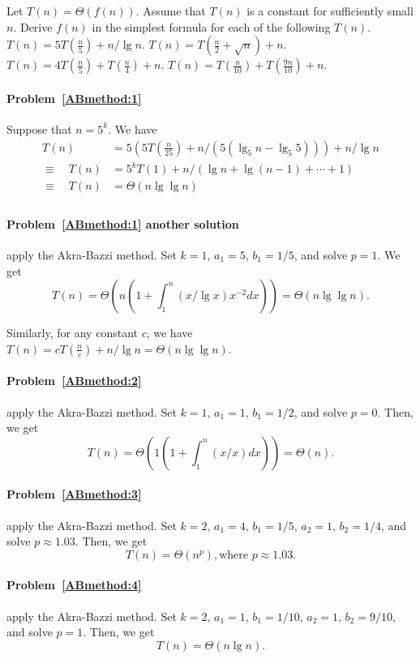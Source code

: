 \begin{Exercise}
Let $T(n) = \Theta(f(n))$. Assume that $T(n)$ is a constant for sufficiently small $n$. Derive $f(n)$ in the simplest formula for each of the following $T(n)$.
\Question $T(n) = 5T(\frac{n}{5}) + n/\lg n$. \label{ABmethod:1} 
\Question $T(n) = T(\frac{n}{2} + \sqrt{n}) + n$. \label{ABmethod:2} 
\Question $T(n) = 4T(\frac{n}{5}) + T(\frac{n}{4}) + n$. \label{ABmethod:3} 
\Question $T(n) = T(\frac{n}{10}) + T(\frac{9n}{10}) + n$. \label{ABmethod:4} 
\end{Exercise}
\begin{Answer}
\paragraph{Problem~\ref{ABmethod:1}} Suppose that $n = 5^k$. We have
\begin{align*}
 T(n)  & = 5(5T(\frac{n}{25}) + n/(5(\lg_5 n - \lg_5 5))) + n/\lg n \\
\equiv \quad T(n) & = 5^kT(1) + n/(\lg n + \lg (n-1) + \cdots + 1) \\
\equiv  \quad T(n) &=  \Theta(n \lg \lg n) \\
\end{align*}

\paragraph{Problem~\ref{ABmethod:1} another solution} apply the Akra\--Bazzi method. Set $k = 1$, $a_1 = 5$, $b_1 = 1/5$, and solve $p = 1$. We get
\[ T(n) = \Theta( n (1 + \int_{1}^n (x / \lg x) x^{-2} dx)) = \Theta(n \lg \lg n). \]
\begin{remark} Similarly, for any constant $c$, we have $T(n) = cT(\frac{n}{c}) + n/\lg n = \Theta(n \lg \lg n)$.
\end{remark}

\paragraph{Problem~\ref{ABmethod:2}} apply the Akra\--Bazzi method. Set $k = 1$, $a_1 = 1$, $b_1 = 1/2$, and solve $p = 0$. Then, we get
\[ T(n) = \Theta( 1 (1 + \int_{1}^n (x / x) dx)) = \Theta(n). \]

\paragraph{Problem~\ref{ABmethod:3}} apply the Akra\--Bazzi method. Set $k = 2$, $a_1 = 4$, $b_1 = 1/5$, $a_2 = 1$, $b_2 = 1/4$, and solve $p \approx 1.03$. Then, we get
\[ T(n) = \Theta( n^{p}), \text{where } p \approx 1.03. \]

\paragraph{Problem~\ref{ABmethod:4}} apply the Akra\--Bazzi method. Set $k = 2$, $a_1 = 1$, $b_1 = 1/10$, $a_2 = 1$, $b_2 = 9/10$, and solve $p = 1$. Then, we get
\[ T(n) = \Theta(n \lg n). \]

\end{Answer}

